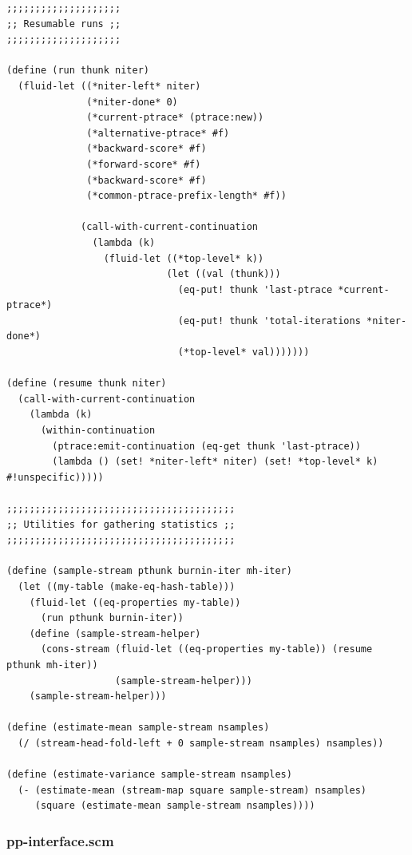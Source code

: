 \documentclass{article}
\begin{document}
\begin{verbatim}
;;;;;;;;;;;;;;;;;;;;
;; Resumable runs ;;
;;;;;;;;;;;;;;;;;;;;

(define (run thunk niter)
  (fluid-let ((*niter-left* niter)
              (*niter-done* 0)
              (*current-ptrace* (ptrace:new))
              (*alternative-ptrace* #f)
              (*backward-score* #f)
              (*forward-score* #f)
              (*backward-score* #f)
              (*common-ptrace-prefix-length* #f))

             (call-with-current-continuation
               (lambda (k)
                 (fluid-let ((*top-level* k))
                            (let ((val (thunk)))
                              (eq-put! thunk 'last-ptrace *current-ptrace*)
                              (eq-put! thunk 'total-iterations *niter-done*)
                              (*top-level* val)))))))

(define (resume thunk niter)
  (call-with-current-continuation
    (lambda (k)
      (within-continuation
        (ptrace:emit-continuation (eq-get thunk 'last-ptrace))
        (lambda () (set! *niter-left* niter) (set! *top-level* k) #!unspecific)))))

;;;;;;;;;;;;;;;;;;;;;;;;;;;;;;;;;;;;;;;;
;; Utilities for gathering statistics ;;
;;;;;;;;;;;;;;;;;;;;;;;;;;;;;;;;;;;;;;;;

(define (sample-stream pthunk burnin-iter mh-iter)
  (let ((my-table (make-eq-hash-table)))
    (fluid-let ((eq-properties my-table))
      (run pthunk burnin-iter))
    (define (sample-stream-helper)
      (cons-stream (fluid-let ((eq-properties my-table)) (resume pthunk mh-iter))
                   (sample-stream-helper)))
    (sample-stream-helper)))

(define (estimate-mean sample-stream nsamples)
  (/ (stream-head-fold-left + 0 sample-stream nsamples) nsamples))

(define (estimate-variance sample-stream nsamples)
  (- (estimate-mean (stream-map square sample-stream) nsamples)
     (square (estimate-mean sample-stream nsamples))))
\end{verbatim}

\subsubsection{pp-interface.scm}
\end{document}
